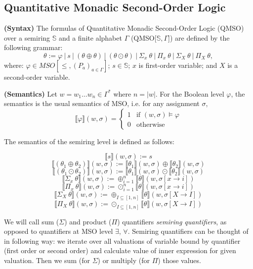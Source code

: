 \documentclass[12pt]{article}
\theoremstyle{definition}
\begin{document}
\subsection{Quantitative Monadic Second-Order Logic}

\textbf{(Syntax)} The formulas of Quantitative Monadic Second-Order Logic (QMSO) over a semiring $\mathbb{S}$ and a finite alphabet $\Gamma$ (QMSO[$\mathbb{S}, \Gamma$]) are defined by the following grammar:
$$ \theta := \varphi \ | \ s \ | \ (\theta \oplus \theta) \ | \ (\theta \odot \theta) \ | \ \Sigma_x \ \theta \ | \ \Pi_x \ \theta \ | \ \Sigma_X \ \theta \ | \ \Pi_X \ \theta,$$
where: $\varphi \in MSO[\leq, (P_a)_{a \in \Gamma}]$; $s \in \mathbb{S}$; $x$ is first-order variable; and $X$ is a second-order variable.

\textbf{(Semantics)} Let $w 
= w_1 \dots w_n \in \Gamma^*$ where $n = |w|$. For the Boolean level $\varphi$, the semantics is the usual semantics of MSO, i.e. for any assignment $\sigma$,
\begin{equation*}
    \llbracket\varphi\rrbracket(w, \sigma) =
      \begin{cases}
        1 & \text{if $(w, \sigma) \models \varphi$}\\
        0 & \text{otherwise}
      \end{cases}       
\end{equation*}

The semantics of the semiring level is defined as follows:

$$\llbracket s\rrbracket(w, \sigma) := s$$
$$\llbracket(\theta_1 \oplus \theta_2)\rrbracket(w, \sigma) := \llbracket\theta_1\rrbracket(w, \sigma) \oplus \llbracket\theta_2\rrbracket(w, \sigma)$$
$$\llbracket(\theta_1 \odot \theta_2)\rrbracket(w, \sigma) := \llbracket\theta_1\rrbracket(w, \sigma) \odot \llbracket\theta_2\rrbracket(w, \sigma)$$
$$\llbracket \Sigma_x \ \theta \rrbracket(w, \sigma) := \oplus^n_{i=1}\llbracket \theta \rrbracket (w, \sigma[x \rightarrow i])$$
$$\llbracket \Pi_x \ \theta \rrbracket(w, \sigma) := \odot^n_{i=1}\llbracket \theta \rrbracket (w, \sigma[x \rightarrow i])$$
$$\llbracket \Sigma_X \ \theta \rrbracket(w, \sigma) := \oplus_{I \subseteq [1,n]}\llbracket \theta \rrbracket (w, \sigma[X \rightarrow I])$$
$$\llbracket \Pi_X \ \theta \rrbracket(w, \sigma) := \odot_{I \subseteq [1,n]}\llbracket \theta \rrbracket (w, \sigma[X \rightarrow I])$$

We will call sum ($\Sigma$) and product ($\Pi$) quantifiers \emph{semiring quantifiers}, as opposed to quantifiers at MSO level $\exists$, $\forall$. Semiring quantifiers can be thought of in following way: we iterate over all valuations of variable bound by quantifier (first order or second order) and calculate value of inner expression for given valuation. Then we sum (for $\Sigma$) or multiply (for $\Pi$) those values.
\end{document}
